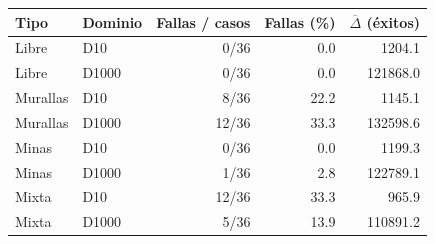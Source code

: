 \begin{tabular}{llrrr}
\hline
Tipo & Dominio & Fallas / casos & Fallas (\%) & $\overline{\Delta}$ (éxitos) \\
\hline
Libre & D10 & 0/36 & 0.0 & 1204.1 \\
Libre & D1000 & 0/36 & 0.0 & 121868.0 \\
Murallas & D10 & 8/36 & 22.2 & 1145.1 \\
Murallas & D1000 & 12/36 & 33.3 & 132598.6 \\
Minas & D10 & 0/36 & 0.0 & 1199.3 \\
Minas & D1000 & 1/36 & 2.8 & 122789.1 \\
Mixta & D10 & 12/36 & 33.3 & 965.9 \\
Mixta & D1000 & 5/36 & 13.9 & 110891.2 \\
\hline
\end{tabular}
